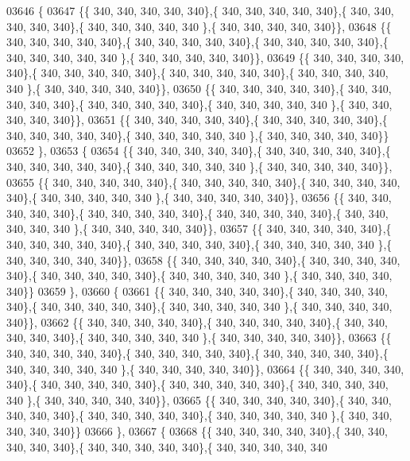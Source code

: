 \begin{DoxyCode}
03646 \{
03647 \{\{ 340, 340, 340, 340, 340\},\{ 340, 340, 340, 340, 340\},\{ 340, 340, 340, 340, 340\},\{ 340, 340, 340, 340, 340
      \},\{ 340, 340, 340, 340, 340\}\},
03648 \{\{ 340, 340, 340, 340, 340\},\{ 340, 340, 340, 340, 340\},\{ 340, 340, 340, 340, 340\},\{ 340, 340, 340, 340, 340
      \},\{ 340, 340, 340, 340, 340\}\},
03649 \{\{ 340, 340, 340, 340, 340\},\{ 340, 340, 340, 340, 340\},\{ 340, 340, 340, 340, 340\},\{ 340, 340, 340, 340, 340
      \},\{ 340, 340, 340, 340, 340\}\},
03650 \{\{ 340, 340, 340, 340, 340\},\{ 340, 340, 340, 340, 340\},\{ 340, 340, 340, 340, 340\},\{ 340, 340, 340, 340, 340
      \},\{ 340, 340, 340, 340, 340\}\},
03651 \{\{ 340, 340, 340, 340, 340\},\{ 340, 340, 340, 340, 340\},\{ 340, 340, 340, 340, 340\},\{ 340, 340, 340, 340, 340
      \},\{ 340, 340, 340, 340, 340\}\}
03652 \},
03653 \{
03654 \{\{ 340, 340, 340, 340, 340\},\{ 340, 340, 340, 340, 340\},\{ 340, 340, 340, 340, 340\},\{ 340, 340, 340, 340, 340
      \},\{ 340, 340, 340, 340, 340\}\},
03655 \{\{ 340, 340, 340, 340, 340\},\{ 340, 340, 340, 340, 340\},\{ 340, 340, 340, 340, 340\},\{ 340, 340, 340, 340, 340
      \},\{ 340, 340, 340, 340, 340\}\},
03656 \{\{ 340, 340, 340, 340, 340\},\{ 340, 340, 340, 340, 340\},\{ 340, 340, 340, 340, 340\},\{ 340, 340, 340, 340, 340
      \},\{ 340, 340, 340, 340, 340\}\},
03657 \{\{ 340, 340, 340, 340, 340\},\{ 340, 340, 340, 340, 340\},\{ 340, 340, 340, 340, 340\},\{ 340, 340, 340, 340, 340
      \},\{ 340, 340, 340, 340, 340\}\},
03658 \{\{ 340, 340, 340, 340, 340\},\{ 340, 340, 340, 340, 340\},\{ 340, 340, 340, 340, 340\},\{ 340, 340, 340, 340, 340
      \},\{ 340, 340, 340, 340, 340\}\}
03659 \},
03660 \{
03661 \{\{ 340, 340, 340, 340, 340\},\{ 340, 340, 340, 340, 340\},\{ 340, 340, 340, 340, 340\},\{ 340, 340, 340, 340, 340
      \},\{ 340, 340, 340, 340, 340\}\},
03662 \{\{ 340, 340, 340, 340, 340\},\{ 340, 340, 340, 340, 340\},\{ 340, 340, 340, 340, 340\},\{ 340, 340, 340, 340, 340
      \},\{ 340, 340, 340, 340, 340\}\},
03663 \{\{ 340, 340, 340, 340, 340\},\{ 340, 340, 340, 340, 340\},\{ 340, 340, 340, 340, 340\},\{ 340, 340, 340, 340, 340
      \},\{ 340, 340, 340, 340, 340\}\},
03664 \{\{ 340, 340, 340, 340, 340\},\{ 340, 340, 340, 340, 340\},\{ 340, 340, 340, 340, 340\},\{ 340, 340, 340, 340, 340
      \},\{ 340, 340, 340, 340, 340\}\},
03665 \{\{ 340, 340, 340, 340, 340\},\{ 340, 340, 340, 340, 340\},\{ 340, 340, 340, 340, 340\},\{ 340, 340, 340, 340, 340
      \},\{ 340, 340, 340, 340, 340\}\}
03666 \},
03667 \{
03668 \{\{ 340, 340, 340, 340, 340\},\{ 340, 340, 340, 340, 340\},\{ 340, 340, 340, 340, 340\},\{ 340, 340, 340, 340, 340

\end{DoxyCode}
